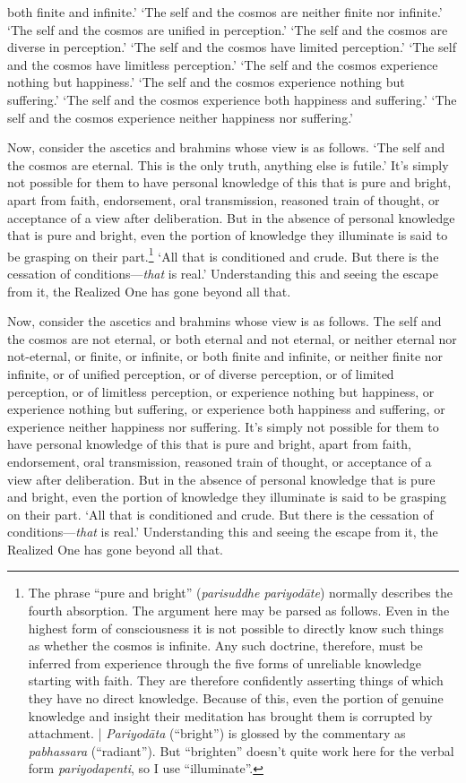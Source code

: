 \documentclass[12pt,openany]{book}%
\begin{document}
both finite and infinite.’ ‘The self and the cosmos are neither finite nor infinite.’ ‘The self and the cosmos are unified in perception.’ ‘The self and the cosmos are diverse in perception.’ ‘The self and the cosmos have limited perception.’ ‘The self and the cosmos have limitless perception.’ ‘The self and the cosmos experience nothing but happiness.’ ‘The self and the cosmos experience nothing but suffering.’ ‘The self and the cosmos experience both happiness and suffering.’ ‘The self and the cosmos experience neither happiness nor suffering.’ 

Now, consider the ascetics and brahmins whose view is as follows. ‘The self and the cosmos are eternal. This is the only truth, anything else is futile.’ It’s simply not possible for them to have personal knowledge of this that is pure and bright, apart from faith, endorsement, oral transmission, reasoned train of thought, or acceptance of a view after deliberation. But in the absence of personal knowledge that is pure and bright, even the portion of knowledge they illuminate is said to be grasping on their part.\footnote{The phrase “pure and bright” (\textit{parisuddhe \textsanskrit{pariyodāte}}) normally describes the fourth absorption. The argument here may be parsed as follows. Even in the highest form of consciousness it is not possible to directly know such things as whether the cosmos is infinite. Any such doctrine, therefore, must be inferred from experience through the five forms of unreliable knowledge starting with faith. They are therefore confidently asserting things of which they have no direct knowledge. Because of this, even the portion of genuine knowledge and insight their meditation has brought them is corrupted by attachment. | \textit{\textsanskrit{Pariyodāta}} (“bright”) is glossed by the commentary as \textit{pabhassara} (“radiant”). But “brighten” doesn’t quite work here for the verbal form \textit{pariyodapenti}, so I use “illuminate”. } ‘All that is conditioned and crude. But there is the cessation of conditions—\emph{that} is real.’ Understanding this and seeing the escape from it, the Realized One has gone beyond all that. 

Now, consider the ascetics and brahmins whose view is as follows. The self and the cosmos are not eternal, or both eternal and not eternal, or neither eternal nor not-eternal, or finite, or infinite, or both finite and infinite, or neither finite nor infinite, or of unified perception, or of diverse perception, or of limited perception, or of limitless perception, or experience nothing but happiness, or experience nothing but suffering, or experience both happiness and suffering, or experience neither happiness nor suffering. It’s simply not possible for them to have personal knowledge of this that is pure and bright, apart from faith, endorsement, oral transmission, reasoned train of thought, or acceptance of a view after deliberation. But in the absence of personal knowledge that is pure and bright, even the portion of knowledge they illuminate is said to be grasping on their part. ‘All that is conditioned and crude. But there is the cessation of conditions—\emph{that} is real.’ Understanding this and seeing the escape from it, the Realized One has gone beyond all that. 
\end{document}
